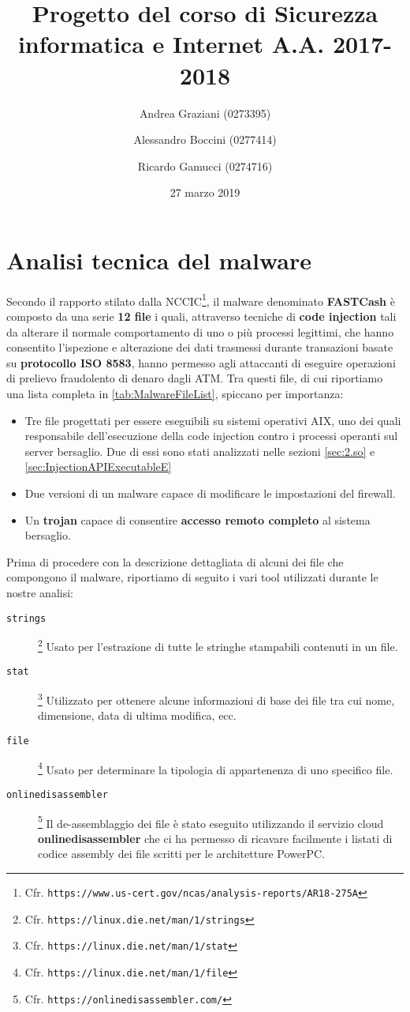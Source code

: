 \documentclass[10pt,a4paper, titlepage]{report}
\title{Progetto del corso di Sicurezza informatica e Internet A.A. 2017-2018}
\author[1]{Andrea Graziani (0273395)}
\author[1]{Alessandro Boccini (0277414)}
\author[1]{Ricardo Gamucci (0274716)}
\affil[1]{Università degli Studi di Roma Tor Vergata}
\date{27 marzo 2019}
\begin{document}
\maketitle
\tableofcontents
\newpage

\chapter{Analisi tecnica del malware}

Secondo il rapporto stilato dalla NCCIC\footnote{Cfr. \texttt{https://www.us-cert.gov/ncas/analysis-reports/AR18-275A}}, il malware denominato \textbf{FASTCash} è composto da una serie \textbf{12 file} i quali, attraverso tecniche di \textbf{code injection} tali da alterare il normale comportamento di uno o più processi legittimi, che hanno consentito l'ispezione e alterazione dei dati trasmessi durante transazioni basate su \textbf{protocollo ISO 8583}, hanno permesso agli attaccanti di eseguire operazioni di prelievo fraudolento di denaro dagli ATM.
Tra questi file, di cui riportiamo una lista completa in \ref{tab:MalwareFileList}, spiccano per importanza:

\begin{itemize}
\item Tre file progettati per essere eseguibili su sistemi operativi AIX, uno dei quali responsabile dell'esecuzione della code injection contro i processi operanti sul server bersaglio. Due di essi sono stati analizzati nelle sezioni \ref{sec:2.so} e \ref{sec:InjectionAPIExecutableE}

\item Due versioni di un malware capace di modificare le impostazioni del firewall.

\item Un \textbf{trojan} capace di consentire \textbf{accesso remoto completo} al sistema bersaglio.
\end{itemize}

Prima di procedere con la descrizione dettagliata di alcuni dei file che compongono il malware, riportiamo di seguito i vari tool utilizzati durante le nostre analisi:

\begin{description}
\item[\texttt{strings}]\footnote{Cfr. \texttt{https://linux.die.net/man/1/strings}} Usato per l'estrazione di tutte le stringhe stampabili contenuti in un file.
\item[\texttt{stat}]\footnote{Cfr. \texttt{https://linux.die.net/man/1/stat}} Utilizzato per ottenere alcune informazioni di base dei file tra cui nome, dimensione, data di ultima modifica, ecc.
\item[\texttt{file}]\footnote{Cfr. \texttt{https://linux.die.net/man/1/file}} Usato per determinare la tipologia di appartenenza di uno specifico file.
\item[\texttt{onlinedisassembler}]\footnote{Cfr. \texttt{https://onlinedisassembler.com/}} Il de-assemblaggio dei file è stato eseguito utilizzando il servizio cloud \textbf{onlinedisassembler} che ci ha permesso di ricavare facilmente i listati di codice assembly dei file scritti per le architetture PowerPC\texttrademark.
\end{description}
\end{document}
